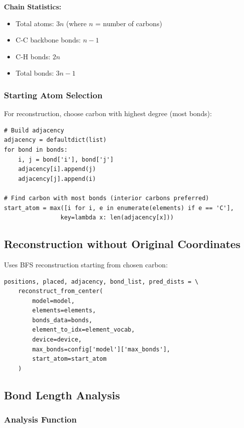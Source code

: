 \documentclass[11pt,a4paper]{article}
\begin{document}
\textbf{Chain Statistics:}
\begin{itemize}
    \item Total atoms: $3n$ (where $n$ = number of carbons)
    \item C-C backbone bonds: $n - 1$
    \item C-H bonds: $2n$
    \item Total bonds: $3n - 1$
\end{itemize}

\subsubsection{Starting Atom Selection}

For reconstruction, choose carbon with highest degree (most bonds):

\begin{lstlisting}[caption={Find Starting Atom (lines 219-221)}]
# Build adjacency
adjacency = defaultdict(list)
for bond in bonds:
    i, j = bond['i'], bond['j']
    adjacency[i].append(j)
    adjacency[j].append(i)

# Find carbon with most bonds (interior carbons preferred)
start_atom = max([i for i, e in enumerate(elements) if e == 'C'],
                key=lambda x: len(adjacency[x]))
\end{lstlisting}

\subsection{Reconstruction without Original Coordinates}

Uses BFS reconstruction starting from chosen carbon:

\begin{lstlisting}[caption={Polymer Reconstruction (lines 223-231)}]
positions, placed, adjacency, bond_list, pred_dists = \
    reconstruct_from_center(
        model=model,
        elements=elements,
        bonds_data=bonds,
        element_to_idx=element_vocab,
        device=device,
        max_bonds=config['model']['max_bonds'],
        start_atom=start_atom
    )
\end{lstlisting}

\subsection{Bond Length Analysis}

\subsubsection{Analysis Function}
\end{document}

